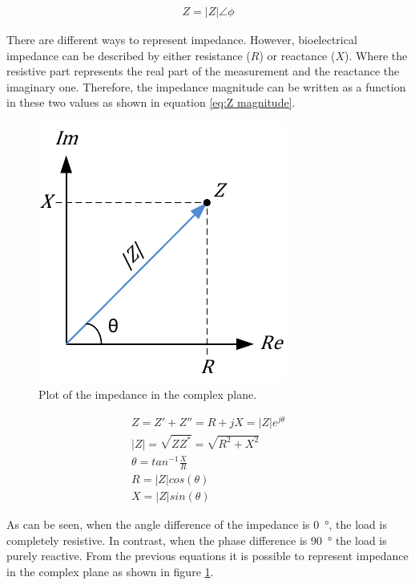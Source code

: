 \begin{align}
	\label{eq:phasor}
	Z = \lvert Z \rvert  \angle \phi
\end{align}

There are different ways to represent impedance. However, bioelectrical impedance can be described by either resistance ($R$) or reactance ($X$). Where the resistive part represents the real part of the measurement and the reactance the imaginary one. Therefore, the impedance magnitude can be written as a function in these two values as shown in equation \ref{eq:Z magnitude}.

\begin{figure}[!htpb]
	\centering
	\includegraphics{figure_2}    
	\caption[Complex representation of impedance]{Plot of the impedance in the complex plane.}
	\label{fig:complex impedance}
\end{figure}

\begin{gather}
	\label{eq:Z magnitude}
	Z = Z' + Z'' = R + jX = \lvert Z \rvert e^{j\theta}\\
	|Z| = \sqrt{Z Z^{*}} = \sqrt{R^2 + X^2} \\
	\theta = tan^{-1}\frac{X}{R} \\
	\label{eq:resistance}
	R = \lvert Z \rvert cos(\theta) \\
	\label{eq:reactance}
	X = \lvert Z \rvert sin(\theta)
\end{gather}

As can be seen, when the angle difference of the impedance is \SI{0}{\degree}, the load is completely resistive. In contrast, when the phase difference is \SI{90}{\degree} the load is purely reactive. From the previous equations it is possible to represent impedance in the complex plane as shown in figure \ref{fig:complex impedance}.


